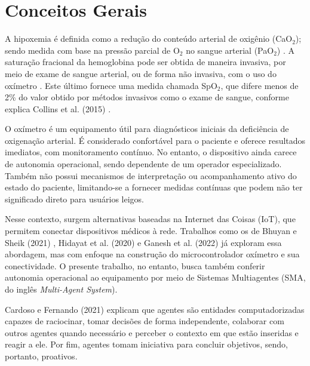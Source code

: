 \section{Conceitos Gerais} \label{sec:concepts}
A hipoxemia é definida como a redução do conteúdo arterial de oxigênio (CaO$_2$); sendo medida com base na pressão parcial de O$_2$ no sangue arterial (PaO$_2$) \cite{immichCapacitacaoEmOxigenoterapia2023}. A saturação fracional da hemoglobina pode ser obtida de maneira invasiva, por meio de exame de sangue arterial, ou de forma não invasiva, com o uso do oxímetro \cite{collins2015relating}. Este último fornece uma medida chamada SpO$_2$, que difere menos de 2\% do valor obtido por métodos invasivos como o exame de sangue, conforme explica Collins et al. (2015) \cite{collins2015relating}.

O oxímetro é um equipamento útil para diagnósticos iniciais da deficiência de oxigenação arterial. É considerado confortável para o paciente e oferece resultados imediatos, com monitoramento contínuo. No entanto, o dispositivo ainda carece de autonomia operacional, sendo dependente de um operador especializado. Também não possui mecanismos de interpretação ou acompanhamento ativo do estado do paciente, limitando-se a fornecer medidas contínuas que podem não ter significado direto para usuários leigos.

Nesse contexto, surgem alternativas baseadas na Internet das Coisas (IoT), que permitem conectar dispositivos médicos à rede. Trabalhos como os de Bhuyan e Sheik (2021) \cite{bhuyan2021designing}, Hidayat et al. (2020) \cite{hidayat2020designing} e 
Ganesh et al. (2022) \cite{ganesh2022iot} já exploram essa abordagem, mas com enfoque na construção do microcontrolador oxímetro e sua conectividade. O presente trabalho, no entanto, busca também conferir autonomia operacional ao equipamento por meio de Sistemas Multiagentes (SMA, do inglês \textit{Multi-Agent System}). 

Cardoso e Fernando (2021) \cite{cardoso2021review} explicam que agentes são entidades computadorizadas capazes de raciocinar, tomar decisões de forma independente, colaborar com outros agentes quando necessário e perceber o contexto em que estão inseridas e reagir a ele. Por fim, agentes tomam iniciativa para concluir objetivos, sendo, portanto, proativos.

